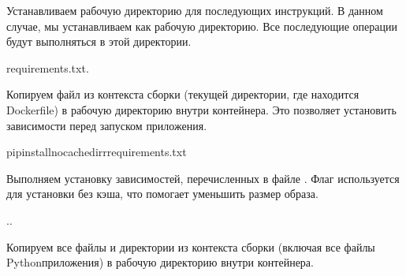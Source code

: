 \documentclass[letterpaper,10pt,russian]{sphinxmanual}
\begin{document}
\sphinxAtStartPar
Устанавливаем рабочую директорию для последующих инструкций. В данном случае, мы устанавливаем  как рабочую директорию. Все последующие операции будут выполняться в этой директории.

\begin{sphinxVerbatim}[commandchars=\\\{\}]
requirements.txt.
\end{sphinxVerbatim}

\sphinxAtStartPar
Копируем файл  из контекста сборки (текущей директории, где находится Dockerfile) в рабочую директорию  внутри контейнера. Это позволяет установить зависимости перед запуском приложения.

\begin{sphinxVerbatim}[commandchars=\\\{\}]
pipinstall\PYGZhy{}\PYGZhy{}no\PYGZhy{}cache\PYGZhy{}dir\PYGZhy{}rrequirements.txt
\end{sphinxVerbatim}

\sphinxAtStartPar
Выполняем установку зависимостей, перечисленных в файле . Флаг  используется для установки без кэша, что помогает уменьшить размер образа.

\begin{sphinxVerbatim}[commandchars=\\\{\}]
..
\end{sphinxVerbatim}

\sphinxAtStartPar
Копируем все файлы и директории из контекста сборки (включая все файлы Python\sphinxhyphen{}приложения) в рабочую директорию  внутри контейнера.

\begin{sphinxVerbatim}[commandchars=\\\{\}]
\PYG{p}{[}\PYG{p}{]}
\end{sphinxVerbatim}
\end{document}
